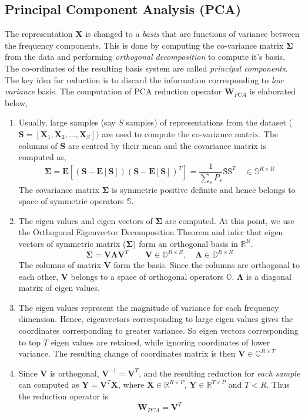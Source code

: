 \subsection{Principal Component Analysis (PCA)}
\label{pca}

The representation $\textbf{X}$ is changed to a \textit{basis} that are functions of variance between the frequency components. This is done by computing the co-variance matrix $\bm{\Sigma}$ from the data and performing \textit{orthogonal decomposition} to compute it's basis. The co-ordinates of the resulting basis system are called \textit{principal components}. The key idea for reduction is to discard the information corresponding to \textit{low variance} basis. The computation of PCA reduction operator $\textbf{W}_{PCA}$ is elaborated below,  

\begin{enumerate}[label=(\alph*)]
\item Usually, large samples (say $S$ samples) of representations from the dataset ($ \textbf{S} = [\textbf{X}_{1}, \textbf{X}_{2}, ..., \textbf{X}_{S}])$ are used to compute the co-variance matrix. The columns of $\textbf{S}$ are centred by their mean and the covariance matrix is computed as,
\[
   \bm{\Sigma} = \textbf{E}[(\textbf{S} - \textbf{E}[\textbf{S}])(\textbf{S} - \textbf{E}[\textbf{S}])^{T}] = \frac{1}{\displaystyle\sum_{s}{P_{s}}}\textbf{\^S}\textbf{\^S}^{T} \quad \in \mathbb{S}^{R \times R}
\]
The covariance matrix $\bm{\Sigma}$ is symmetric positive definite and hence belongs to space of symmetric operators $\mathbb{S}$.
\item The eigen values and eigen vectors of $\bm{\Sigma}$ are computed. At this point, we use the Orthogonal Eigenvector Decomposition Theorem and infer that eigen vectors of symmetric matrix ($\bm{\Sigma}$) form an orthogonal basis in $\mathbb{R}^{R}$. 
\[
\bm{\Sigma} = \textbf{V}\bm{\Lambda}\textbf{V}^{T} \qquad \textbf{V} \in \mathbb{O}^{R \times R}, \quad \bm{\Lambda} \in \mathbb{D}^{R \times R}
\]
The columns of matrix $\textbf{V}$ form the basis. Since the columns are orthogonal to each other, $\textbf{V}$ belongs to a space of orthogonal operators $\mathbb{O}$. $\bm{\Lambda}$ is a diagonal matrix of eigen values.

\item The eigen values represent the magnitude of variance for each frequency dimension.  Hence, eigenvectors corresponding to large eigen values gives the coordinates corresponding to greater variance. So eigen vectors corresponding to top $T$ eigen values are retained, while ignoring coordinates of lower variance. The resulting change of coordinates matrix is then $\textbf{\^V} \in \mathbb{O}^{R \times T}$
   
\item Since $\textbf{\^V}$ is orthogonal, $\textbf{\^{V}}^{-1} = \textbf{\^{V}}^{T}$, and the resulting reduction for \textit{each sample} can computed as $\textbf{Y} = \textbf{\^{V}}^{T}\textbf{X}$, where $\textbf{X} \in \mathbb{R}^{R \times P}$, $\textbf{Y} \in \mathbb{R}^{T \times P}$ and $T < R$. Thus the reduction operator is
\[
\textbf{W}_{PCA} = \textbf{\^V}^{T}
\]

\end{enumerate}   


